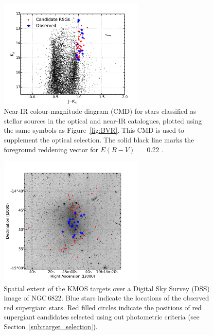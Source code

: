 \begin{figure}
 \centering
 \includegraphics[width=0.65\textwidth]{ngc6822/N6822_jk}
 \caption[$J-K$ colour magnitude diagram]{
          Near-IR colour-magnitude diagram (CMD) for stars classified as stellar sources in the optical and near-IR catalogues, plotted using the same symbols as Figure~\ref{fig:BVR}.
          This CMD is used to supplement the optical selection.
          The solid black line marks the foreground reddening vector for $E(B-V)$~=~0.22
          \protect\citep{1998ApJ...500..525S}.
         }
 \label{fig:JK}
\end{figure}


\begin{figure}
 \centering
 \includegraphics[width=0.65\textwidth]{ngc6822/N6822_RSGs_thesis}
 \caption[Targets identified in on-sky image]{Spatial extent of the KMOS targets over a Digital Sky Survey (DSS) image of NGC\,6822.
          Blue stars indicate the locations of the observed red supergiant stars.
          Red filled circles indicate the positions of red supergiant candidates selected using out photometric criteria (see Section~\ref{sub:target_selection}).
          }
 \label{fig:N6822}
\end{figure}

